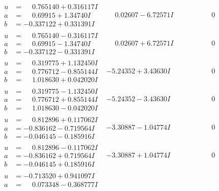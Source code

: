 \documentclass[1p]{elsarticle_modified}
\theoremstyle{definition}
\begin{document}
$$\begin{array}{c|c|c}
\begin{aligned}
u &= \phantom{-}0.765140 + 0.316117 I \\
a &= \phantom{-}0.69915 + 1.34740 I \\
b &= -0.337122 + 0.331391 I\end{aligned}
 & \phantom{-}0.02607 - 6.72571 I & \phantom{-0.000000 } 0 \\ \hline\begin{aligned}
u &= \phantom{-}0.765140 - 0.316117 I \\
a &= \phantom{-}0.69915 - 1.34740 I \\
b &= -0.337122 - 0.331391 I\end{aligned}
 & \phantom{-}0.02607 + 6.72571 I & \phantom{-0.000000 } 0 \\ \hline\begin{aligned}
u &= \phantom{-}0.319775 + 1.132450 I \\
a &= \phantom{-}0.776712 - 0.855144 I \\
b &= \phantom{-}1.018630 + 0.042020 I\end{aligned}
 & -5.24352 + 3.43630 I & \phantom{-0.000000 } 0 \\ \hline\begin{aligned}
u &= \phantom{-}0.319775 - 1.132450 I \\
a &= \phantom{-}0.776712 + 0.855144 I \\
b &= \phantom{-}1.018630 - 0.042020 I\end{aligned}
 & -5.24352 - 3.43630 I & \phantom{-0.000000 } 0 \\ \hline\begin{aligned}
u &= \phantom{-}0.812896 + 0.117062 I \\
a &= -0.836162 - 0.719564 I \\
b &= -0.046145 - 0.185916 I\end{aligned}
 & -3.30887 - 1.04774 I & \phantom{-0.000000 } 0 \\ \hline\begin{aligned}
u &= \phantom{-}0.812896 - 0.117062 I \\
a &= -0.836162 + 0.719564 I \\
b &= -0.046145 + 0.185916 I\end{aligned}
 & -3.30887 + 1.04774 I & \phantom{-0.000000 } 0 \\ \hline\begin{aligned}
u &= -0.713520 + 0.941097 I \\
a &= \phantom{-}0.073348 - 0.368777 I \\

\end{aligned}
\end{array}$$
\end{document}
